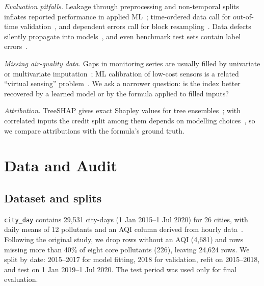 \documentclass[conference]{IEEEtran}
\begin{document}
\textit{Evaluation pitfalls.} Leakage through preprocessing and non-temporal splits inflates
reported performance in applied ML~\cite{kapoor2023leakage}; time-ordered data call for
out-of-time validation~\cite{bergmeir2012cv}, and dependent errors call for block
resampling~\cite{kunsch1989bootstrap}. Data defects silently propagate into
models~\cite{sambasivan2021data}, and even benchmark test sets contain label
errors~\cite{northcutt2021label}.

\textit{Missing air-quality data.} Gaps in monitoring series are usually filled by univariate
or multivariate imputation~\cite{junger2015imputation,little2019missing}; ML calibration of
low-cost sensors is a related ``virtual sensing'' problem~\cite{concas2021lowcost}. We ask a
narrower question: is the index better recovered by a learned model or by the formula
applied to filled inputs?

\textit{Attribution.} TreeSHAP gives exact Shapley values for tree
ensembles~\cite{lundberg2017shap,lundberg2020treeshap}; with correlated inputs the credit split
among them depends on modelling choices~\cite{aas2021shapley}, so we compare attributions with
the formula's ground truth.

\section{Data and Audit}\label{sec:data}
\subsection{Dataset and splits}
\texttt{city\_day} contains 29,531 city-days (1 Jan 2015--1 Jul 2020) for 26 cities, with daily
means of 12 pollutants and an AQI column derived from hourly data~\cite{rao2020kaggle}.
Following the original study, we drop rows without an AQI (4,681) and rows missing more
than 40\% of eight core pollutants (226), leaving 24,624 rows. We split by date: 2015--2017
for model fitting, 2018 for validation, refit on 2015--2018, and test on
1 Jan 2019--1 Jul 2020. The test period was used only for final evaluation.
\end{document}
